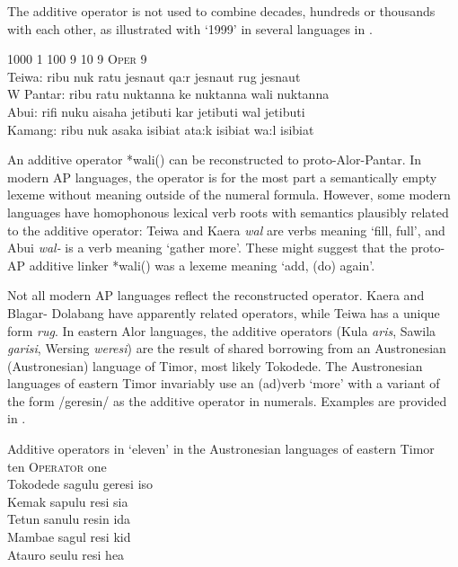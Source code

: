 \documentclass[output=paper]{LSP/langsci}
\begin{document}
The additive operator is not used to combine decades, hundreds or thousands with each other, as illustrated with `1999' in several languages in . 

\ea%
\label{ex:6:15} 
\glllll  {}     1000  1  100  9  10  9  \textsc{Oper}  9\\
  Teiwa:  ribu  nuk  ratu  jesna{\textglotstop}ut  qa:r  jesna{\textglotstop}ut  rug  jesna{\textglotstop}ut\\
  {W Pantar:}  ribu  {}   ratu  nuktanna{\ng}  ke nuktanna{\ng} wali  nuktanna{\ng}\\
   Abui:  rifi  nuku  aisaha  jeti{\ng}buti  kar  jeti{\ng}buti  wal  jeti{\ng}buti\\
   Kamang: ribu  nuk  asaka  isi{\ng}biat  ata:k  isi{\ng}biat  wa:l  isi{\ng}biat\\
\z

An additive operator *wali({\ng}) can be reconstructed to proto-Alor-Pantar. In modern AP languages, the operator is for the most part a semantically empty lexeme without meaning outside of the numeral formula. However, some modern languages have homophonous lexical verb roots with semantics plausibly related to the additive operator: Teiwa and Kaera \textit{wal} are verbs meaning `fill, full', and Abui \textit{wal-} is a verb meaning `gather more'. These might suggest that the proto-AP additive linker *wali({\ng}) was a lexeme meaning `add, (do) again'. 

Not all modern AP languages reflect the reconstructed operator. Kaera and Blagar- Dolabang have apparently related operators, while Teiwa has a unique form \textit{rug}. In eastern Alor languages, the additive operators (Kula \textit{aris}\textit{{\textbari}}\textit{{\ng}}, Sawila \textit{garisi{\ng}}, Wersing \textit{weresi{\ng}}) are the result of shared borrowing from an Austronesian (Austronesian) language of Timor, most likely Tokodede. The Austronesian languages of eastern Timor invariably use an (ad)verb `more' with a variant of the form /geresin/ as the additive operator in numerals. Examples are provided in .   



\ea%
\label{ex:6:16}
Additive operators in `eleven' in the Austronesian languages of eastern Timor\\
\gllllll {}  ten    O\textsc{perator}    one  \\
  Tokodede    sagulu  geresi    iso           \\
  Kemak     sapulu  resi    sia           \\
Tetun    sanulu  resin    ida           \\
Mambae    sagul    resi    kid           \\
Atauro    se{\ng}ulu  resi    hea           \\
\z
\end{document}
